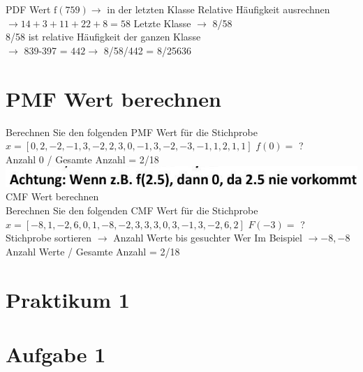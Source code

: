 \documentclass[10pt]{article}
\begin{document}
PDF Wert $\mathrm{f}(759) \rightarrow$ in der letzten Klasse Relative Häufigkeit ausrechnen $\rightarrow 14+3+11+22+8=58$ Letzte Klasse $\rightarrow$ 8/58\\
8/58 ist relative Häufigkeit der ganzen Klasse\\
$\rightarrow$ 839-397 = $442 \rightarrow$ 8/58/442 = 8/25636

\section*{PMF Wert berechnen}
Berechnen Sie den folgenden PMF Wert für die Stichprobe\\
$x=[0,2,-2,-1,3,-2,2,3,0,-1,3,-2,-3,-1,1,2,1,1]$ $f(0)=$ ?\\
Anzahl 0 / Gesamte Anzahl = 2/18\\
\includegraphics[max width=\textwidth]{2024_12_29_0906b02acf849bda8665g-2} CMF Wert berechnen\\
Berechnen Sie den folgenden CMF Wert für die Stichprobe $x=[-8,1,-2,6,0,1,-8,-2,3,3,3,0,3,-1,3,-2,6,2]$ $F(-3)=$ ?\\
Stichprobe sortieren $\rightarrow$ Anzahl Werte bis gesuchter Wer Im Beispiel $\rightarrow-8,-8$\\
Anzahl Werte / Gesamte Anzahl = 2/18

\section*{Praktikum 1}
\section*{Aufgabe 1}
\end{document}
